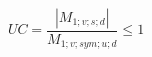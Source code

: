 \documentclass[12pt]{article}
\begin{document}
\begin{displaymath}
UC = \frac {|M_{1;v;s;d}|} {M_{1;v;sym;u;d}} \leq 1
\end{displaymath}
\end{document}
